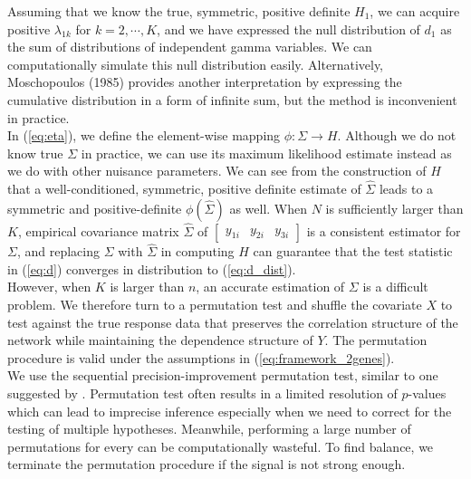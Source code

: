 \documentclass[aap,authoryear, preprint]{imsart}
\numberwithin{equation}{section}
\theoremstyle{plain}
\begin{document}
Assuming that we know the true, symmetric, positive definite $H_1$, we can acquire positive $\lambda_{1k}$ for $k = 2, \cdots, K$, and we have expressed the null distribution of $d_1$ as the sum of distributions of independent gamma variables. We can computationally simulate this null distribution easily. Alternatively, Moschopoulos (1985) provides another interpretation by expressing the cumulative distribution in a form of infinite sum, but the method is inconvenient in practice.\\

In (\ref{eq:eta}), we define the element-wise mapping $\phi: \Sigma \rightarrow H$. Although we do not know true $\Sigma$ in practice, we can use its maximum likelihood estimate instead as we do with other nuisance parameters. We can see from the construction of $H$ that a well-conditioned, symmetric, positive definite estimate of $\hat{\Sigma}$ leads to a symmetric and positive-definite $\phi(\hat{\Sigma})$ as well. When $N$ is sufficiently larger than $K$, empirical covariance matrix $\hat{\Sigma}$ of $\begin{bmatrix} y_{1i} & y_{2i} & y_{3i} \end{bmatrix}$ is a consistent estimator for $\Sigma$, and replacing $\Sigma$ with $\hat{\Sigma}$ in computing $H$ can guarantee that the test statistic in (\ref{eq:d}) converges in distribution to (\ref{eq:d_dist}). \\

However, when $K$ is larger than $n$, an accurate estimation of $\Sigma$ is a difficult problem. We therefore turn to a permutation test and shuffle the covariate $X$ to test against the true response data that preserves the correlation structure of the network while maintaining the dependence structure of $Y$. The permutation procedure is valid under the assumptions in (\ref{eq:framework_2genes}). \\

We use the sequential precision-improvement permutation test, similar to one suggested by \cite{chen2012exponential}. Permutation test often results in a limited resolution of $p$-values which can lead to imprecise inference especially when we need to correct for the testing of multiple hypotheses. Meanwhile, performing a large number of permutations for every can be computationally wasteful. To find balance, we terminate the permutation procedure if the signal is not strong enough. \\
\end{document}
